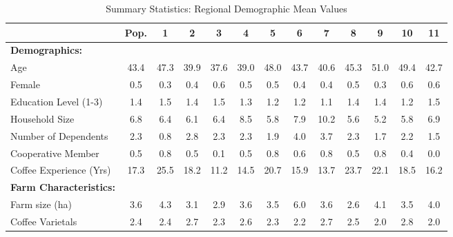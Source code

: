 \begin{table}[htbp]\centering \scriptsize
\def\sym#1{\ifmmode^{#1}\else\(^{#1}\)\fi}
\caption{Summary Statistics: Regional Demographic Mean Values \label{summary_stats}}
\begin{tabular}{l*{12}{c}}
\toprule
                &\multicolumn{1}{c}{Pop.}&\multicolumn{1}{c}{1}&\multicolumn{1}{c}{2}&\multicolumn{1}{c}{3}&\multicolumn{1}{c}{4}&\multicolumn{1}{c}{5}&\multicolumn{1}{c}{6}&\multicolumn{1}{c}{7}&\multicolumn{1}{c}{8}&\multicolumn{1}{c}{9}&\multicolumn{1}{c}{10}&\multicolumn{1}{c}{11}\\
\midrule
\textbf{Demographics:}&         &         &         &         &         &         &         &         &         &         &         &         \\
\addlinespace
Age             &     43.4&     47.3&     39.9&     37.6&     39.0&     48.0&     43.7&     40.6&     45.3&     51.0&     49.4&     42.7\\
\addlinespace
Female          &      0.5&      0.3&      0.4&      0.6&      0.5&      0.5&      0.4&      0.4&      0.5&      0.3&      0.6&      0.6\\
\addlinespace
Education Level (1-3)&      1.4&      1.5&      1.4&      1.5&      1.3&      1.2&      1.2&      1.1&      1.4&      1.4&      1.2&      1.5\\
\addlinespace
Household Size  &      6.8&      6.4&      6.1&      6.4&      8.5&      5.8&      7.9&     10.2&      5.6&      5.2&      5.8&      6.9\\
\addlinespace
Number of Dependents&      2.3&      0.8&      2.8&      2.3&      2.3&      1.9&      4.0&      3.7&      2.3&      1.7&      2.2&      1.5\\
\addlinespace
Cooperative Member&      0.5&      0.8&      0.5&      0.1&      0.5&      0.8&      0.6&      0.8&      0.5&      0.8&      0.4&      0.0\\
\addlinespace
Coffee Experience (Yrs)&     17.3&     25.5&     18.2&     11.2&     14.5&     20.7&     15.9&     13.7&     23.7&     22.1&     18.5&     16.2\\
\addlinespace
\textbf{Farm Characteristics:}&         &         &         &         &         &         &         &         &         &         &         &         \\
\addlinespace
Farm size (ha)  &      3.6&      4.3&      3.1&      2.9&      3.6&      3.5&      6.0&      3.6&      2.6&      4.1&      3.5&      4.0\\
\addlinespace
Coffee Varietals&      2.4&      2.4&      2.7&      2.3&      2.6&      2.3&      2.2&      2.7&      2.5&      2.0&      2.8&      2.0\\

\end{tabular}
\end{table}
